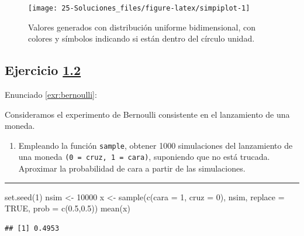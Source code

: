 \documentclass[
]{book}
\newenvironment{Shaded}{\begin{snugshade}}{\end{snugshade}}
\newcommand{\AttributeTok}[1]{\textcolor[rgb]{0.77,0.63,0.00}{#1}}
\newcommand{\ConstantTok}[1]{\textcolor[rgb]{0.00,0.00,0.00}{#1}}
\newcommand{\DecValTok}[1]{\textcolor[rgb]{0.00,0.00,0.81}{#1}}
\newcommand{\FloatTok}[1]{\textcolor[rgb]{0.00,0.00,0.81}{#1}}
\newcommand{\FunctionTok}[1]{\textcolor[rgb]{0.00,0.00,0.00}{#1}}
\newcommand{\NormalTok}[1]{#1}
\newcommand{\OtherTok}[1]{\textcolor[rgb]{0.56,0.35,0.01}{#1}}
\providecommand{\tightlist}{%
  \setlength{\itemsep}{0pt}\setlength{\parskip}{0pt}}
\theoremstyle{break}
\theoremstyle{nonumberplain}
\begin{document}
\begin{figure}[!htb]

{\centering \texttt{[image: 25-Soluciones\_files/figure-latex/simpiplot-1]} 

}

\caption{Valores generados con distribución uniforme bidimensional, con colores y símbolos indicando si están dentro del círculo unidad.}\label{fig:simpiplot}
\end{figure}

\hypertarget{sol-bernoulli}{%
\subsection{\texorpdfstring{Ejercicio \href{ejercicios.html\#exr:bernoulli}{1.2}}{Ejercicio 1.2}}\label{sol-bernoulli}}

Enunciado \ref{exr:bernoulli}:

Consideramos el experimento de Bernoulli consistente en el
lanzamiento de una moneda.

\begin{enumerate}
\def\labelenumi{\alph{enumi})}
\tightlist
\item
  Empleando la función \texttt{sample}, obtener 1000 simulaciones del
  lanzamiento de una moneda \texttt{(0\ =\ cruz,\ 1\ =\ cara)}, suponiendo que
  no está trucada. Aproximar la probabilidad de cara a partir de
  las simulaciones.
\end{enumerate}

\begin{center}\rule{0.5\linewidth}{0.5pt}\end{center}

\begin{Shaded}
\begin{Highlighting}[]
\FunctionTok{set.seed}\NormalTok{(}\DecValTok{1}\NormalTok{)}
\NormalTok{nsim }\OtherTok{\textless{}{-}} \DecValTok{10000}
\NormalTok{x }\OtherTok{\textless{}{-}} \FunctionTok{sample}\NormalTok{(}\FunctionTok{c}\NormalTok{(}\AttributeTok{cara =} \DecValTok{1}\NormalTok{, }\AttributeTok{cruz =} \DecValTok{0}\NormalTok{), nsim, }\AttributeTok{replace =} \ConstantTok{TRUE}\NormalTok{, }\AttributeTok{prob =} \FunctionTok{c}\NormalTok{(}\FloatTok{0.5}\NormalTok{,}\FloatTok{0.5}\NormalTok{))}
\FunctionTok{mean}\NormalTok{(x)}
\end{Highlighting}
\end{Shaded}

\begin{verbatim}
## [1] 0.4953
\end{verbatim}
\end{document}
